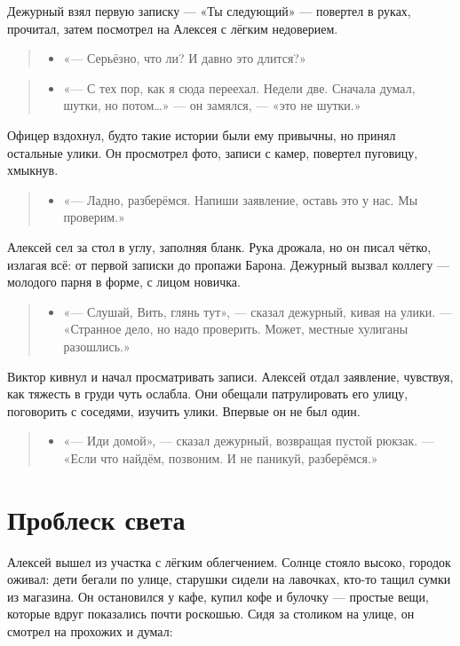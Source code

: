 \documentclass[12pt,a4paper]{book}
\newenvironment{dialogue}{\begin{quote}\itshape\begin{itemize}\item[]}{\end{itemize}\end{quote}}
\begin{document}
Дежурный взял первую записку — «Ты следующий» — повертел в руках, прочитал, затем посмотрел на Алексея с лёгким недоверием.

\begin{dialogue}
«— Серьёзно, что ли? И давно это длится?»
\end{dialogue}

\begin{dialogue}
«— С тех пор, как я сюда переехал. Недели две. Сначала думал, шутки, но потом…» — он замялся, — «это не шутки.»
\end{dialogue}

Офицер вздохнул, будто такие истории были ему привычны, но принял остальные улики. Он просмотрел фото, записи с камер, повертел пуговицу, хмыкнув.

\begin{dialogue}
«— Ладно, разберёмся. Напиши заявление, оставь это у нас. Мы проверим.»
\end{dialogue}

Алексей сел за стол в углу, заполняя бланк. Рука дрожала, но он писал чётко, излагая всё: от первой записки до пропажи Барона. Дежурный вызвал коллегу — молодого парня в форме, с лицом новичка.

\begin{dialogue}
«— Слушай, Вить, глянь тут», — сказал дежурный, кивая на улики. — «Странное дело, но надо проверить. Может, местные хулиганы разошлись.»
\end{dialogue}

Виктор кивнул и начал просматривать записи. Алексей отдал заявление, чувствуя, как тяжесть в груди чуть ослабла. Они обещали патрулировать его улицу, поговорить с соседями, изучить улики. Впервые он не был один.

\begin{dialogue}
«— Иди домой», — сказал дежурный, возвращая пустой рюкзак. — «Если что найдём, позвоним. И не паникуй, разберёмся.»
\end{dialogue}

\section{Проблеск света}

Алексей вышел из участка с лёгким облегчением. Солнце стояло высоко, городок оживал: дети бегали по улице, старушки сидели на лавочках, кто-то тащил сумки из магазина. Он остановился у кафе, купил кофе и булочку — простые вещи, которые вдруг показались почти роскошью. Сидя за столиком на улице, он смотрел на прохожих и думал: 
\end{document}
